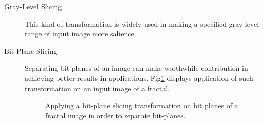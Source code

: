 \documentclass{article}
\begin{document}
\begin{description}
\begin{description}
 \item[Gray-Level Slicing] This kind of transformation is widely used in making a specified gray-level range of input image more salience. 
 
 \item[Bit-Plane Slicing] Separating bit planes of an image can make worthwhile contribution in achieving better results in applications. Fig\ref{fig:bitPlaneSlicing} displays application of such transformation on an input image of a fractal.
\begin{figure}
\center
{}
\caption{Applying a bit-plane slicing transformation on bit planes of a fractal image in order to separate bit-planes.}
\label{fig:bitPlaneSlicing}
\end{figure} 
 
 \end{description}
 
 
 \end{description}
\end{document}
